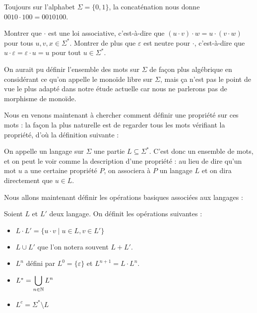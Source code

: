 \begin{expl}
    Toujours sur l'alphabet $\Sigma= \{0,1\}$, la concaténation nous donne $0010\cdot 100 = 0010100$.
\end{expl}

\begin{exo}
    Montrer que $\cdot$ est une loi associative, c'est-à-dire que $(u\cdot v)\cdot w = u\cdot (v\cdot w)$ pour tous $u,v,x\in\Sigma^*$. Montrer de plus que $\varepsilon$ est neutre pour $\cdot$, c'est-à-dire que $u\cdot\varepsilon = \varepsilon \cdot u = u$ pour tout $u\in\Sigma^*$.
\end{exo}

\begin{rmk}
    On aurait pu définir l'ensemble des mots sur $\Sigma$ de façon plus algébrique en considérant ce qu'on appelle le monoïde libre sur $\Sigma$, mais ça n'est pas le point de vue le plus adapté dans notre étude actuelle car nous ne parlerons pas de morphisme de monoïde.
\end{rmk}

Nous en venons maintenant à chercher comment définir une propriété sur ces mots : la façon la plus naturelle est de regarder tous les mots vérifiant la propriété, d'où la définition suivante :

\begin{defi}[Langage]
    On appelle un langage sur $\Sigma$ une partie $L\subseteq\Sigma^*$. C'est donc un ensemble de mots, et on peut le voir comme la description d'une propriété : au lieu de dire qu'un mot $u$ a une certaine propriété $P$, on associera à $P$ un langage $L$ et on dira directement que $u\in L$.
\end{defi}

Nous allons maintenant définir les opérations basiques associées aux langages :

\begin{defi}
    Soient $L$ et $L'$ deux langage. On définit les opérations suivantes :
    \begin{itemize}[label=$\bullet$]
        \item $L\cdot L' = \{ u\cdot v \mid u\in L, v \in L'\}$
        \item $L\cup L'$ que l'on notera souvent $L + L'$.
        \item $L^n$ défini par $L^0 = \{\varepsilon\}$ et $L^{n+1} = L\cdot L^n$.
        \item $L^* = \displaystyle{\bigcup_{n\in\mathbb{N}}L^n}$
        \item $L^c = \Sigma^* \setminus L$
    \end{itemize}
\end{defi}

